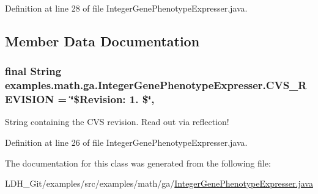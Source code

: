 Definition at line 28 of file Integer\-Gene\-Phenotype\-Expresser.\-java.



\subsection{Member Data Documentation}
\hypertarget{classexamples_1_1math_1_1ga_1_1_integer_gene_phenotype_expresser_a2cd4ae976e3ffdff744ba39ab1f819a7}{
\subsubsection[{C\-V\-S\-\_\-\-R\-E\-V\-I\-S\-I\-O\-N}]{\setlength{\rightskip}{0pt plus 5cm}final String examples.\-math.\-ga.\-Integer\-Gene\-Phenotype\-Expresser.\-C\-V\-S\-\_\-\-R\-E\-V\-I\-S\-I\-O\-N = \char`\"{}\$Revision\-: 1. \$\char`\"{}\hspace{0.3cm}{\ttfamily [static]}, {\ttfamily [private]}}}\label{classexamples_1_1math_1_1ga_1_1_integer_gene_phenotype_expresser_a2cd4ae976e3ffdff744ba39ab1f819a7}
String containing the C\-V\-S revision. Read out via reflection! 

Definition at line 26 of file Integer\-Gene\-Phenotype\-Expresser.\-java.



The documentation for this class was generated from the following file\-:\begin{DoxyCompactItemize}
\item 
L\-D\-H\-\_\-\-Git/examples/src/examples/math/ga/\hyperlink{_integer_gene_phenotype_expresser_8java}{Integer\-Gene\-Phenotype\-Expresser.\-java}\end{DoxyCompactItemize}
